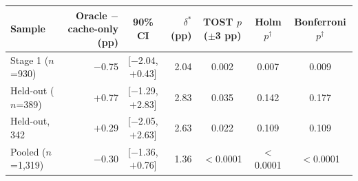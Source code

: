 \begin{tabular}{lrcrccc}
\toprule
Sample & Oracle $-$ cache-only (pp) & 90\% CI & $\delta^*$ (pp) & TOST $p$ ($\pm$3 pp) & Holm $p^\dagger$ & Bonferroni $p^\dagger$ \\
\midrule
Stage 1 ($n$=930) & $-$0.75 & [$-$2.04, $+$0.43] & 2.04 & 0.002 & 0.007 & 0.009 \\
Held-out ($n$=389) & $+$0.77 & [$-$1.29, $+$2.83] & 2.83 & 0.035 & 0.142 & 0.177 \\
Held-out, 342 & $+$0.29 & [$-$2.05, $+$2.63] & 2.63 & 0.022 & 0.109 & 0.109 \\
Pooled ($n$=1{,}319) & $-$0.30 & [$-$1.36, $+$0.76] & 1.36 & $<$0.0001 & $<$0.0001 & $<$0.0001 \\
\bottomrule
\end{tabular}
